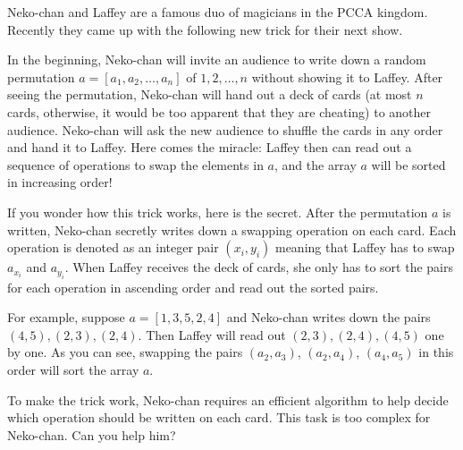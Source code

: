 Neko-chan and Laffey are a famous duo of magicians in the PCCA kingdom.
Recently they came up with the following new trick for their next show.

In the beginning, Neko-chan will invite an audience to write down a random permutation $a=[a_1,a_2,\ldots,a_n]$ of $1,2,\ldots,n$ without showing it to Laffey.
After seeing the permutation, Neko-chan will hand out a deck of cards (at most $n$ cards, otherwise, it would be too apparent that they are cheating) to another audience.
Neko-chan will ask the new audience to shuffle the cards in any order and hand it to Laffey.
Here comes the miracle: Laffey then can read out a sequence of operations to swap the elements in $a$, and the array $a$ will be sorted in increasing order!

If you wonder how this trick works, here is the secret.
After the permutation $a$ is written, Neko-chan secretly writes down a swapping operation on each card.
Each operation is denoted as an integer pair $(x_i, y_i)$ meaning that Laffey has to swap $a_{x_i}$ and $a_{y_i}$.
When Laffey receives the deck of cards, she only has to sort the pairs for each operation in ascending order and read out the sorted pairs.

For example, suppose $a = [1,3,5,2,4]$ and Neko-chan writes down the pairs $(4,5),(2,3),(2,4)$.
Then Laffey will read out $(2,3),(2,4),(4,5)$ one by one.
As you can see, swapping the pairs $(a_2,a_3)$, $(a_2,a_4)$, $(a_4,a_5)$ in this order will sort the array $a$.

To make the trick work, Neko-chan requires an efficient algorithm to help decide which operation should be written on each card.
This task is too complex for Neko-chan. Can you help him?